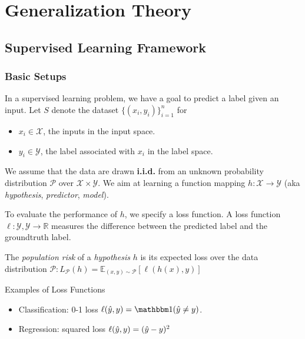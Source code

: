 
\part{Generalization Theory}
\chapter{Supervised Learning Framework}

\section{Basic Setups}
In a supervised learning problem, we have a goal to predict a label given an input. Let \(S\)
denote the dataset \(\{(x_i, y_i)\}_{i=1}^n\) for 
\begin{itemize}
    \item \(x_i \in \mathcal{X}\), the inputs in the input space. 
    \item \(y_i \in \mathcal{Y}\), the label associated with \(x_i\) in the label space. 
\end{itemize}

We assume that the data are drawn \textbf{i.i.d.} from an unknown probability distribution 
\(\mathcal{P}\) over \(\mathcal{X} \times \mathcal{Y}\). We aim at learning a function mapping 
\(h \colon \mathcal{X} \to \mathcal{Y}\) (aka \emph{hypothesis}, \emph{predictor}, \emph{model}). 


To evaluate the performance of \(h\), we specify a loss function. A loss function 
\(\ell \colon \mathcal{Y}, \mathcal{Y} \to \mathbb{R}\) measures the difference between the predicted label 
and the groundtruth label. 

\begin{definition}\label{def:population_risk}
    The \emph{population risk} of a \emph{hypothesis} \(h\) is its expected loss over the data 
    distribution \(\mathcal{P} \colon L_{\mathcal{P}} (h) = \mathbb{E}_{(x,y)\sim \mathcal{P}}[\ell (h(x), y)]\)
\end{definition}

\begin{eg}
    Examples of Loss Functions 
    \begin{itemize}
        \item Classification: 0-1 loss \(\ell(\yhat, y) = \indi(\yhat \neq y)\). 
        \item Regression: squared loss \(\ell(\hat{y}, y) = (\hat{y} - y)^2\)
    \end{itemize}
\end{eg}

